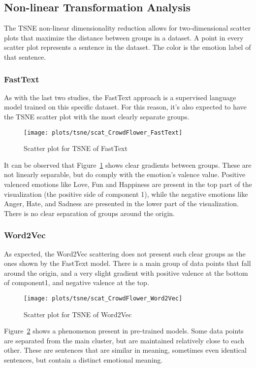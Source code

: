 \subsection{Non-linear Transformation Analysis}\label{sub:Non-linear Transformation Analysis}
The TSNE non-linear dimensionality reduction allows for two-dimensional scatter plots that maximize the distance between groups in a dataset. A point in every scatter plot represents a sentence in the dataset. The color is the emotion label of that sentence.
\subsubsection{FastText}
As with the last two studies, the FastText approach is a supervised language model trained on this specific dataset. For this reason, it's also expected to have the TSNE scatter plot with the most clearly separate groups.
\begin{figure}[H]
  \texttt{[image: plots/tsne/scat\_CrowdFlower\_FastText]}
  \centering
  \caption{Scatter plot for TSNE of FastText}\label{fig:scat_CrowdFlower_FastText}
\end{figure}
It can be observed that Figure~\ref{fig:scat_CrowdFlower_FastText} shows clear gradients between groups. These are not linearly separable, but do comply with the emotion's valence value. Positive valenced emotions like Love, Fun and Happiness are present in the top part of the visualization (the positive side of component 1), while the negative emotions like Anger, Hate, and Sadness are presented in the lower part of the visualization. There is no clear separation of groups around the origin.
\subsubsection{Word2Vec}
As expected, the Word2Vec scattering does not present such clear groups as the ones shown by the FastText model. There is a main group of data points that fall around the origin, and a very slight gradient with positive valence at the bottom of component1, and negative valence at the top.
\begin{figure}[H]
  \texttt{[image: plots/tsne/scat\_CrowdFlower\_Word2Vec]}
  \centering
  \caption{Scatter plot for TSNE of Word2Vec}\label{fig:scat_CrowdFlower_Word2Vec}
\end{figure}
Figure~\ref{fig:scat_CrowdFlower_Word2Vec} shows a phenomenon present in pre-trained models. Some data points are separated from the main cluster, but are maintained relatively close to each other. These are sentences that are similar in meaning, sometimes even identical sentences, but contain a distinct emotional meaning.
